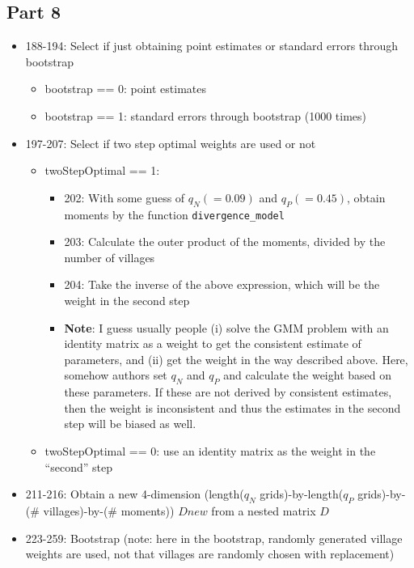 \documentclass[10pt,letterpaper]{article}
\begin{document}
\subsection*{Part 8}
\begin{itemize}
  \item 188-194: Select if just obtaining point estimates or standard errors through bootstrap
    \begin{itemize}
      \item bootstrap == 0: point estimates
      \item bootstrap == 1: standard errors through bootstrap (1000 times)
    \end{itemize}
  \item 197-207: Select if two step optimal weights are used or not
    \begin{itemize}
      \item twoStepOptimal == 1: 
        \begin{itemize}
          \item 202: With some guess of $q_N (= 0.09)$ and $q_P (= 0.45)$, obtain moments by the function \texttt{divergence\_model}
          \item 203: Calculate the outer product of the moments, divided by the number of villages
          \item 204: Take the inverse of the above expression, which will be the weight in the second step
          \item \textbf{Note}: I guess usually people 
            (i) solve the GMM problem with an identity matrix as a weight to get the consistent estimate of parameters, and 
            (ii) get the weight in the way described above.
            Here, somehow authors set $q_N$ and $q_P$ and calculate the weight based on these parameters.
            If these are not derived by consistent estimates, then the weight is inconsistent and thus the estimates in the second step will be biased as well.
        \end{itemize}
      \item twoStepOptimal == 0: use an identity matrix as the weight in the ``second'' step
    \end{itemize}
  \item 211-216: Obtain a new 4-dimension (length($q_N$ grids)-by-length($q_P$ grids)-by-(\# villages)-by-(\# moments))   $Dnew$ from a nested matrix $D$
  \item 223-259: Bootstrap (note: here in the bootstrap, randomly generated village weights are used, not that villages are randomly chosen with replacement)

\end{itemize}
\end{document}
